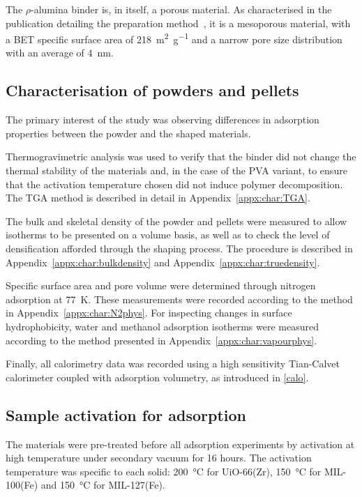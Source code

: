 The \( \rho \)-alumina binder is, in itself, a porous material.
As characterised in the publication detailing the
preparation method~\cite{valekarShapingPorousMetal2017},
it is a mesoporous material, with a BET specific surface
area of \SI{218}{\metre^2\per\gram} and a narrow pore
size distribution with an average of \SI{4}{\nano\metre}.

\subsection{Characterisation of powders and pellets}

The primary interest of the study was observing differences
in adsorption properties between the powder and the shaped materials.

Thermogravimetric analysis was used to verify that the binder
did not change the thermal stability of the materials and, in the
case of the PVA variant, to ensure that the activation temperature
chosen did not induce polymer decomposition. The TGA method is described
in detail in Appendix~\ref{appx:char:TGA}.

The bulk and skeletal density of the powder and pellets were measured
to allow isotherms to be presented on a volume basis, as well as
to check the level of densification afforded through the
shaping process. The procedure is described in Appendix~\ref{appx:char:bulkdensity} and Appendix~\ref{appx:char:truedensity}.

Specific surface area and pore volume were determined through
nitrogen adsorption at \SI{77}{\kelvin}. These measurements were
recorded according to the method in Appendix~\ref{appx:char:N2phys}.
For inspecting changes in surface hydrophobicity, water and
methanol adsorption isotherms were measured according to
the method presented in Appendix~\ref{appx:char:vapourphys}.

Finally, all calorimetry data was recorded using a high sensitivity
Tian-Calvet calorimeter coupled with adsorption volumetry, as
introduced in \autoref{calo}.

\subsection{Sample activation for adsorption}

The materials were pre-treated before all adsorption experiments by
activation at high temperature under secondary vacuum for 16 hours.
The activation temperature was specific
to each solid: \SI{200}{\degreeCelsius} for UiO-66(Zr),
\SI{150}{\degreeCelsius} for MIL-100(Fe) and \SI{150}{\degreeCelsius}
for MIL-127(Fe).
